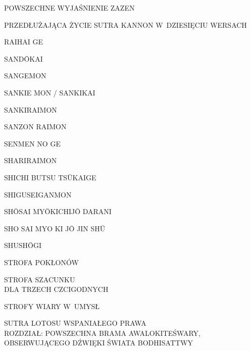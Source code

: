 \par\noindent POWSZECHNE WYJAŚNIENIE ZAZEN \dotfill \makebox[1.0cm][r]{\pageref{ogolne_zalecenia}}
\par\noindent PRZEDŁUŻAJĄCA ŻYCIE SUTRA KANNON W~DZIESIĘCIU WERSACH \dotfill \makebox[1.0cm][r]{\pageref{sutra_kannon}}
\par\noindent RAIHAI GE \dotfill \makebox[1.0cm][r]{\pageref{raihaige}}
\par\noindent SAND\=OKAI \dotfill \makebox[1.0cm][r]{\pageref{sandokai}}
\par\noindent SANGEMON \dotfill \makebox[1.0cm][r]{\pageref{sangemon}}
\par\noindent SANKIE MON / SANKIKAI \dotfill \makebox[1.0cm][r]{\pageref{sankiemon}}
\par\noindent SANKIRAIMON \dotfill \makebox[1.0cm][r]{\pageref{sankiraimon}}
\par\noindent SANZON RAIMON \dotfill \makebox[1.0cm][r]{\pageref{sanzonraimon}}
\par\noindent SENMEN NO GE \dotfill \makebox[1.0cm][r]{\pageref{senmen_no_ge}}
\par\noindent SHARIRAIMON \dotfill \makebox[1.0cm][r]{\pageref{shariraimon}}
\par\noindent SHICHI BUTSU TS\=UKAIGE \dotfill \makebox[1.0cm][r]{\pageref{shichi_butsu_tsukaige}}
\par\noindent SHIGUSEIGANMON \dotfill \makebox[1.0cm][r]{\pageref{shiguseiganmon}}
\par\noindent SH\=OSAI MY\=OKICHIJ\=O DARANI \dotfill \makebox[1.0cm][r]{\pageref{sio_saj_mio}}
\par\noindent SHO SAI MYO KI J\=O JIN SH\=U \dotfill \makebox[1.0cm][r]{\pageref{sho_sai_myo_ki_jo}}
\par\noindent SHUSH\=OGI \dotfill \makebox[1.0cm][r]{\pageref{shushogi}}
\par\noindent STROFA POKŁONÓW \dotfill \makebox[1.0cm][r]{\pageref{strofa_poklonow}}
\par\noindent STROFA SZACUNKU\\ DLA TRZECH CZCIGODNYCH \dotfill \makebox[1.0cm][r]{\pageref{strofa_szacunku}}
\par\noindent STROFY WIARY W~UMYSŁ \dotfill \makebox[1.0cm][r]{\pageref{strofy_wiary_w_umysl}}
\par\noindent SUTRA LOTOSU WSPANIAŁEGO PRAWA\\ROZDZIAŁ: POWSZECHNA BRAMA AWALOKITEŚWARY, OBSERWUJĄCEGO DŹWIĘKI ŚWIATA BODHISATTWY \dotfill \makebox[1.0cm][r]{\pageref{sutralotosu_powszechna_brama}}
